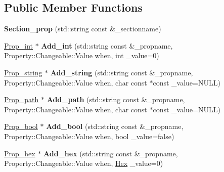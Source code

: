 \subsection*{Public Member Functions}
\begin{DoxyCompactItemize}
\item 
\hypertarget{classSection__prop_ac93eb81df5418886b5e8c9c19add8a7a}{{\bfseries Section\-\_\-prop} (std\-::string const \&\-\_\-sectionname)}\label{classSection__prop_ac93eb81df5418886b5e8c9c19add8a7a}

\item 
\hypertarget{classSection__prop_a90a4ffee1f97048eea1702a56198f071}{\hyperlink{classProp__int}{Prop\-\_\-int} $\ast$ {\bfseries Add\-\_\-int} (std\-::string const \&\-\_\-propname, Property\-::\-Changeable\-::\-Value when, int \-\_\-value=0)}\label{classSection__prop_a90a4ffee1f97048eea1702a56198f071}

\item 
\hypertarget{classSection__prop_afa809042b0504122e814abe1a4c93bff}{\hyperlink{classProp__string}{Prop\-\_\-string} $\ast$ {\bfseries Add\-\_\-string} (std\-::string const \&\-\_\-propname, Property\-::\-Changeable\-::\-Value when, char const $\ast$const \-\_\-value=N\-U\-L\-L)}\label{classSection__prop_afa809042b0504122e814abe1a4c93bff}

\item 
\hypertarget{classSection__prop_a25453b2520f0661d78930592f7f48225}{\hyperlink{classProp__path}{Prop\-\_\-path} $\ast$ {\bfseries Add\-\_\-path} (std\-::string const \&\-\_\-propname, Property\-::\-Changeable\-::\-Value when, char const $\ast$const \-\_\-value=N\-U\-L\-L)}\label{classSection__prop_a25453b2520f0661d78930592f7f48225}

\item 
\hypertarget{classSection__prop_a643331be788b6b3b1f50a6e4ce5f8ebf}{\hyperlink{classProp__bool}{Prop\-\_\-bool} $\ast$ {\bfseries Add\-\_\-bool} (std\-::string const \&\-\_\-propname, Property\-::\-Changeable\-::\-Value when, bool \-\_\-value=false)}\label{classSection__prop_a643331be788b6b3b1f50a6e4ce5f8ebf}

\item 
\hypertarget{classSection__prop_ac83de7979be7017f59ab4f9311d7ad88}{\hyperlink{classProp__hex}{Prop\-\_\-hex} $\ast$ {\bfseries Add\-\_\-hex} (std\-::string const \&\-\_\-propname, Property\-::\-Changeable\-::\-Value when, \hyperlink{classHex}{Hex} \-\_\-value=0)}\label{classSection__prop_ac83de7979be7017f59ab4f9311d7ad88}


\end{DoxyCompactItemize}
